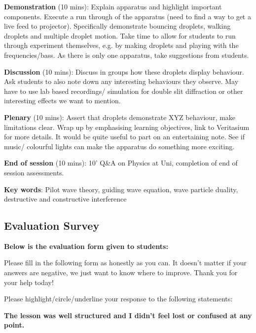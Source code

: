 \noindent \textbf{Demonstration} (10 mins): Explain apparatus and highlight important components. Execute a run through of the apparatus (need to find a way to get a live feed to projector). Specifically demonstrate bouncing droplets, walking droplets and multiple droplet motion. Take time to allow for students to run through experiment themselves, e.g. by making droplets and playing with the frequencies/bass. As there is only one apparatus, take suggestions from students. 

\noindent \textbf{Discussion} (10 mins): Discuss in groups how these droplets display behaviour. Ask students to also note down any interesting behaviours they observe. May have to use lab based recordings/ simulation for double slit diffraction or other interesting effects we want to mention.

\noindent \textbf{Plenary} (10 mins): Assert that droplets demonstrate XYZ behaviour, make limitations clear. Wrap up by emphasising learning objectives, link to Veritasium for more details. It would be quite useful to part on an entertaining note. See if music/ colourful lights can make the apparatus do something more exciting. 

\noindent \textbf{End of session} (10 mins): 10' Q\&A on Physics at Uni, completion of end of session assessments. 



\noindent \textbf{Key words}: Pilot wave theory, guiding wave equation, wave particle duality, destructive and constructive interference

\clearpage

\subsection{Evaluation Survey} \label{evaluationsurvey}
\noindent \textbf{Below is the evaluation form given to students:}
\vspace{3mm}

\noindent Please fill in the following form as honestly as you can. It doesn’t matter if your answers are negative, we just want to know where to improve. Thank you for your help today!

Please highlight/circle/underline your response to the following statements:

\vspace{3mm}

\noindent \textbf{The lesson was well structured and I didn’t feel lost or confused at any point.}

